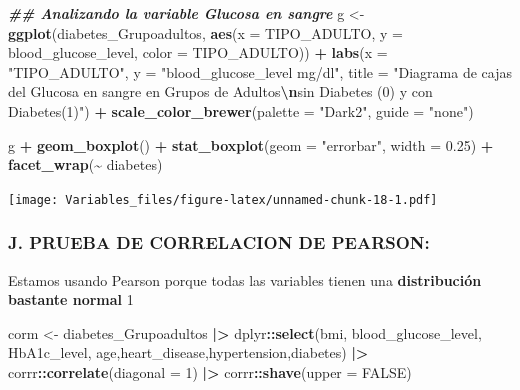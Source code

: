 \documentclass[
]{article}
\newenvironment{Shaded}{\begin{snugshade}}{\end{snugshade}}
\newcommand{\AttributeTok}[1]{\textcolor[rgb]{0.13,0.29,0.53}{#1}}
\newcommand{\ConstantTok}[1]{\textcolor[rgb]{0.56,0.35,0.01}{#1}}
\newcommand{\DecValTok}[1]{\textcolor[rgb]{0.00,0.00,0.81}{#1}}
\newcommand{\DocumentationTok}[1]{\textcolor[rgb]{0.56,0.35,0.01}{\textbf{\textit{#1}}}}
\newcommand{\FloatTok}[1]{\textcolor[rgb]{0.00,0.00,0.81}{#1}}
\newcommand{\FunctionTok}[1]{\textcolor[rgb]{0.13,0.29,0.53}{\textbf{#1}}}
\newcommand{\NormalTok}[1]{#1}
\newcommand{\OtherTok}[1]{\textcolor[rgb]{0.56,0.35,0.01}{#1}}
\newcommand{\SpecialCharTok}[1]{\textcolor[rgb]{0.81,0.36,0.00}{\textbf{#1}}}
\newcommand{\StringTok}[1]{\textcolor[rgb]{0.31,0.60,0.02}{#1}}
\begin{document}
\begin{Shaded}
\begin{Highlighting}[]
\DocumentationTok{\#\# Analizando la variable   Glucosa en sangre}
\NormalTok{g }\OtherTok{\textless{}{-}}
  \FunctionTok{ggplot}\NormalTok{(diabetes\_Grupoadultos, }\FunctionTok{aes}\NormalTok{(}\AttributeTok{x =}\NormalTok{ TIPO\_ADULTO, }\AttributeTok{y =}\NormalTok{ blood\_glucose\_level,}
                   \AttributeTok{color =}\NormalTok{ TIPO\_ADULTO)) }\SpecialCharTok{+}
    \FunctionTok{labs}\NormalTok{(}\AttributeTok{x =} \StringTok{"TIPO\_ADULTO"}\NormalTok{, }\AttributeTok{y =} \StringTok{"blood\_glucose\_level mg/dl"}\NormalTok{, }\AttributeTok{title =} \StringTok{"Diagrama de cajas del Glucosa en sangre en Grupos de Adultos}\SpecialCharTok{\textbackslash{}n}\StringTok{sin Diabetes (0) y con Diabetes(1)"}\NormalTok{) }\SpecialCharTok{+}
    \FunctionTok{scale\_color\_brewer}\NormalTok{(}\AttributeTok{palette =} \StringTok{"Dark2"}\NormalTok{, }\AttributeTok{guide =} \StringTok{"none"}\NormalTok{)}

\NormalTok{g }\SpecialCharTok{+} \FunctionTok{geom\_boxplot}\NormalTok{() }\SpecialCharTok{+} \FunctionTok{stat\_boxplot}\NormalTok{(}\AttributeTok{geom =} \StringTok{"errorbar"}\NormalTok{,}
               \AttributeTok{width =} \FloatTok{0.25}\NormalTok{) }\SpecialCharTok{+} \FunctionTok{facet\_wrap}\NormalTok{(}\SpecialCharTok{\textasciitilde{}}\NormalTok{ diabetes)}
\end{Highlighting}
\end{Shaded}

\texttt{[image: Variables\_files/figure-latex/unnamed-chunk-18-1.pdf]}

\hypertarget{j.-prueba-de-correlacion-de-pearson}{%
\subsubsection{\texorpdfstring{\textbf{J. PRUEBA DE CORRELACION DE
PEARSON:}}{J. PRUEBA DE CORRELACION DE PEARSON:}}\label{j.-prueba-de-correlacion-de-pearson}}

Estamos usando Pearson porque todas las variables tienen una
\textbf{distribución bastante normal} 1

\begin{Shaded}
\begin{Highlighting}[]
\NormalTok{corm }\OtherTok{\textless{}{-}}
\NormalTok{  diabetes\_Grupoadultos }\SpecialCharTok{|\textgreater{}}
\NormalTok{  dplyr}\SpecialCharTok{::}\FunctionTok{select}\NormalTok{(bmi, blood\_glucose\_level, HbA1c\_level, age,heart\_disease,hypertension,diabetes) }\SpecialCharTok{|\textgreater{}}
\NormalTok{  corrr}\SpecialCharTok{::}\FunctionTok{correlate}\NormalTok{(}\AttributeTok{diagonal =} \DecValTok{1}\NormalTok{) }\SpecialCharTok{|\textgreater{}}
\NormalTok{  corrr}\SpecialCharTok{::}\FunctionTok{shave}\NormalTok{(}\AttributeTok{upper =} \ConstantTok{FALSE}\NormalTok{)}
\end{Highlighting}
\end{Shaded}
\end{document}
